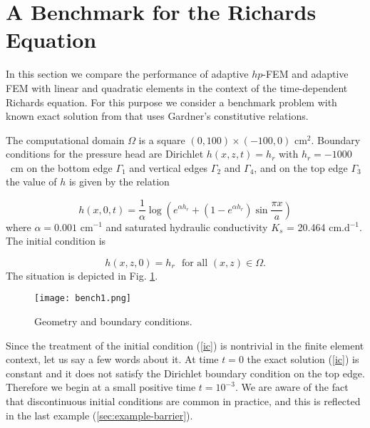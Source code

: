 \documentclass[final,3p,times,twocolumn]{elsarticle}
\begin{document}
\section{A Benchmark for the Richards Equation}
\label{sec:compar}

In this section we compare the performance of 
adaptive $hp$-FEM and adaptive FEM with linear and quadratic 
elements in the context of the time-dependent 
Richards equation. For this purpose we consider a 
benchmark problem with known exact solution from \cite{tracy1}
that uses Gardner's constitutive relations.

The computational domain $\Omega$ is a square $(0, 100)  \times (-100, 0)$ cm${}^2$. 
Boundary conditions for the pressure head are Dirichlet 
$h(x,z,t) = h_r$ with $h_r = -1000$~cm on the bottom edge $\Gamma_1$
and vertical edges $\Gamma_2$ and $\Gamma_4$, and on the 
top edge $\Gamma_3$ the value of $h$ is given by the relation


\begin{equation}\label{bc}
h(x,0,t) = \frac{1}{\alpha}\log \left(e^{\alpha h_r} + \left( 1- e^{\alpha h_r} \right)\sin \frac{\pi x}{a} \right)
\end{equation}
where $\alpha = 0.001$ cm${}^{-1}$ and saturated hydraulic conductivity 
$K_s$ = 20.464 cm.d${}^{-1}$. The initial condition is 

\begin{equation}\label{ic}
h(x,z,0) = h_r \  \ \ \mbox{for all } (x, z) \in \Omega.
\end{equation}
The situation is depicted in Fig. \ref{fig:geom}.

\begin{figure}[!ht]
\begin{center}
\texttt{[image: bench1.png]}
\end{center}
\vspace{-6mm}
\caption{Geometry and boundary conditions.}
\label{fig:geom}
\end{figure}

Since the treatment of the initial condition (\ref{ic}) is nontrivial
in the finite element context, let us say a few words about it. 
At time $t = 0$ the exact solution (\ref{ic}) is constant and it 
does not satisfy the Dirichlet boundary condition on the top edge. 
Therefore we begin at a small positive time $t = 10^{-3}$.
We are aware of the fact that discontinuous initial conditions are common
in practice, and this is reflected in the last example (\ref{sec:example-barrier}).
\end{document}
